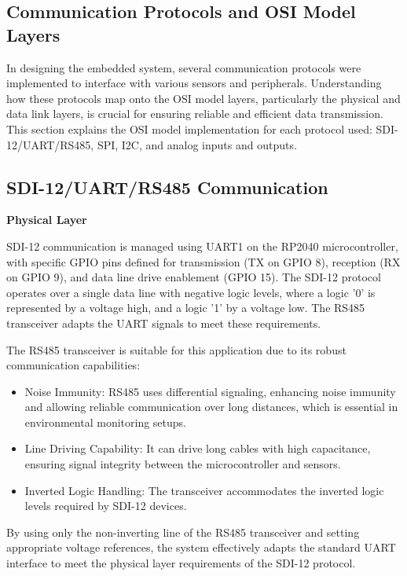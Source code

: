 \subsection{Communication Protocols and OSI Model Layers}

In designing the embedded system, several communication protocols were implemented to interface with various sensors and peripherals. Understanding how these protocols map onto the OSI model layers, particularly the physical and data link layers, is crucial for ensuring reliable and efficient data transmission. This section explains the OSI model implementation for each protocol used: SDI-12/UART/RS485, SPI, I2C, and analog inputs and outputs.

\subsection{SDI-12/UART/RS485 Communication}
\textbf{Physical Layer}

SDI-12 communication is managed using UART1 on the RP2040 microcontroller, with specific GPIO pins defined for transmission (TX on GPIO 8), reception (RX on GPIO 9), and data line drive enablement (GPIO 15). The SDI-12 protocol operates over a single data line with negative logic levels, where a logic '0' is represented by a voltage high, and a logic '1' by a voltage low. The RS485 transceiver adapts the UART signals to meet these requirements.

The RS485 transceiver is suitable for this application due to its robust communication capabilities:

\begin{itemize}
    \item Noise Immunity: RS485 uses differential signaling, enhancing noise immunity and allowing reliable communication over long distances, which is essential in environmental monitoring setups.
    \item Line Driving Capability: It can drive long cables with high capacitance, ensuring signal integrity between the microcontroller and sensors.
    \item Inverted Logic Handling: The transceiver accommodates the inverted logic levels required by SDI-12 devices.
\end{itemize}

By using only the non-inverting line of the RS485 transceiver and setting appropriate voltage references, the system effectively adapts the standard UART interface to meet the physical layer requirements of the SDI-12 protocol.

